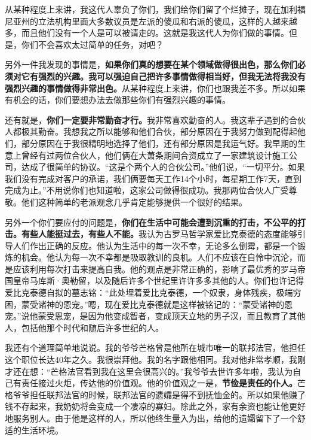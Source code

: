 从某种程度上来讲，我这代人辜负了你们，我们给你们留了个烂摊子，现在加利福尼亚州的立法机构里面大多数议员是左派的傻瓜和右派的傻瓜，这样的人越来越多，而且他们没有一个人是可以被请走的。这就是我这代人为你们做的事情。但是，你们不会喜欢太过简单的任务，对吧？
\par

另外一件我发现的事情是，\textbf{如果你们真的想要在某个领域做得很出色，那么你们必须对它有强烈的兴趣。我可以强迫自己把许多事情做得相当好，但我无法将我没有强烈兴趣的事情做得非常出色。}从某种程度上来讲，你们也跟我差不多。所以如果有机会的话，你们要想办法去做那些你们有强烈兴趣的事情。
\par

还有就是，\textbf{你们一定要非常勤奋才行。}我非常喜欢勤奋的人。我这辈子遇到的合伙人都极其勤奋。我想我之所以能够和他们合伙，部分原因在于我努力做到配得起他们，部分原因在于我很精明地选择了他们，还有部分原因是我运气好。我早期的生意上曾经有过两位合伙人，他们俩在大萧条期间合资成立了一家建筑设计施工公司，达成了很简单的协议。“这是个两个人的合伙公司。”他们说，“一切平分。如果我们没有完成对客户的承诺，我们俩要每天工作14个小时，每星期工作7天，直到完成为止。”不用说你们也知道啦，这家公司做得很成功。我那两位合伙人广受尊敬。他们这种简单的老派观念几乎肯定能够提供一个很好的结果。
\par

另外一个你们要应付的问题是，\textbf{你们在生活中可能会遭到沉重的打击，不公平的打击。有些人能挺过去，有些人不能。}我认为古罗马哲学家爱比克泰德的态度能够引导人们作出正确的反应。他认为生活中的每一次不幸，无论多么倒霉，都是一个锻炼的机会。他认为每一次不幸都是吸取教训的良机。人们不应该在自怜中沉沦，而是应该利用每次打击来提高自我。他的观点是非常正确的，影响了最优秀的罗马帝国皇帝马库斯·奥勒留，以及随后许多个世纪里许许多多其他的人。你们也许记得爱比克泰德自拟的墓志铭：“此处埋着爱比克泰德，一个奴隶，身体残疾，极端穷困，蒙受诸神的恩宠。”嗯，现在爱比克泰德就是这样被铭记的：“蒙受诸神的恩宠。”说他蒙受恩宠，是因为他变成智者，变成顶天立地的男子汉，而且教育了其他人，包括他那个时代和随后许多世纪的人。
\par

我还有个道理简单地说说。我的爷爷芒格曾是他所在城市唯一的联邦法官，他担任这个职位长达40年之久。我很崇拜他。我的名字跟他相同。我对他非常孝顺，我刚才还在想：“芒格法官看到我在这里会很高兴的。”我爷爷去世许多年啦，我认为自己有责任接过火炬，传达他的价值观。他的价值观之一是，\textbf{节俭是责任的仆人。}芒格爷爷担任联邦法官的时候，联邦法官的遗孀是得不到抚恤金的。所以如果他赚了钱不存起来，我奶奶将会变成一个凄凉的寡妇。除此之外，家有余资也能让他更好地服务别人。由于他是这样的人，所以他终生量入为出，给他的遗孀留下了一个舒适的生活环境。
\par

